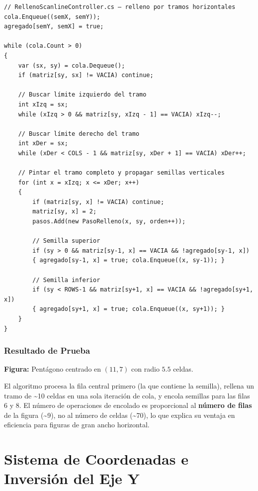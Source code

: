 \documentclass[
  spanish,
  a4paper,
  12pt,
]{article}
\begin{document}
\begin{lstlisting}
// RellenoScanlineController.cs — relleno por tramos horizontales
cola.Enqueue((semX, semY));
agregado[semY, semX] = true;

while (cola.Count > 0)
{
    var (sx, sy) = cola.Dequeue();
    if (matriz[sy, sx] != VACIA) continue;

    // Buscar límite izquierdo del tramo
    int xIzq = sx;
    while (xIzq > 0 && matriz[sy, xIzq - 1] == VACIA) xIzq--;

    // Buscar límite derecho del tramo
    int xDer = sx;
    while (xDer < COLS - 1 && matriz[sy, xDer + 1] == VACIA) xDer++;

    // Pintar el tramo completo y propagar semillas verticales
    for (int x = xIzq; x <= xDer; x++)
    {
        if (matriz[sy, x] != VACIA) continue;
        matriz[sy, x] = 2;
        pasos.Add(new PasoRelleno(x, sy, orden++));

        // Semilla superior
        if (sy > 0 && matriz[sy-1, x] == VACIA && !agregado[sy-1, x])
        { agregado[sy-1, x] = true; cola.Enqueue((x, sy-1)); }

        // Semilla inferior
        if (sy < ROWS-1 && matriz[sy+1, x] == VACIA && !agregado[sy+1, x])
        { agregado[sy+1, x] = true; cola.Enqueue((x, sy+1)); }
    }
}
\end{lstlisting}

\subsubsection{Resultado de Prueba}\label{resultado-de-prueba-8}

\textbf{Figura:} Pentágono centrado en \((11, 7)\) con radio \(5.5\)
celdas.

El algoritmo procesa la fila central primero (la que contiene la
semilla), rellena un tramo de \textasciitilde10 celdas en una sola
iteración de cola, y encola semillas para las filas \(6\) y \(8\). El
número de operaciones de encolado es proporcional al \textbf{número de
filas} de la figura (\textasciitilde9), no al número de celdas
(\textasciitilde70), lo que explica su ventaja en eficiencia para
figuras de gran ancho horizontal.


\section{Sistema de Coordenadas e Inversión del Eje
Y}\label{sistema-de-coordenadas-e-inversiuxf3n-del-eje-y}
\end{document}
